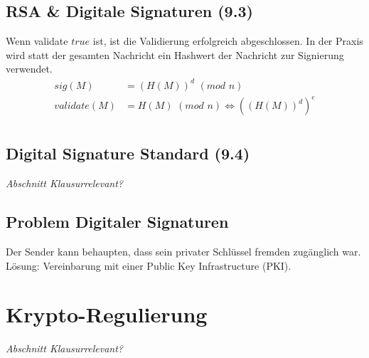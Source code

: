 \section{RSA \& Digitale Signaturen (9.3)}
Wenn validate $true$ ist, ist die Validierung erfolgreich abgeschlossen. In der Praxis wird statt der gesamten Nachricht ein Hashwert der Nachricht zur Signierung verwendet.  
\begin{align*}
sig(M) &= (H(M))^d \hspace{4pt} (mod \hspace{4pt} n) \\
validate(M) &= H(M) \hspace{4pt} (mod \hspace{4pt} n) \Leftrightarrow ((H(M))^d)^e \\   
\end{align*}

\section{Digital Signature Standard (9.4)}
\emph{Abschnitt Klausurrelevant?}

\section{Problem Digitaler Signaturen}
Der Sender kann behaupten, dass sein privater Schlüssel fremden zugänglich war. Lösung: Vereinbarung mit einer Public Key Infrastructure (PKI).

\chapter{Krypto-Regulierung}
\emph{Abschnitt Klausurrelevant?}

